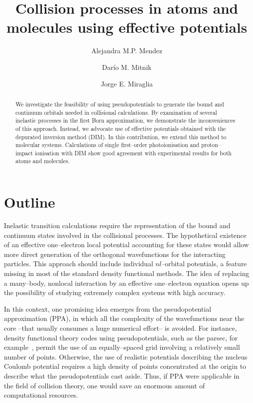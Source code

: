 \documentclass[10pt]{article}
\begin{document}
\title{Collision processes in atoms and molecules using effective 
potentials}
\author[ ]{Alejandra M.P. Mendez}
\author[ ]{Dar\'io M. Mitnik}
\author[ ]{Jorge E. Miraglia}

\maketitle

\tableofcontents

\begin{abstract}
We investigate the feasibility of using pseudopotentials to generate
the bound and continuum orbitals needed in collisional calculations. 
By examination of several inelastic processes in the first Born 
approximation, we demonstrate the inconveniences of this approach. 
Instead, we advocate use of effective potentials obtained with 
the depurated inversion method (DIM). In this contribution, we 
extend this method to molecular systems. Calculations of 
single first--order photoionisation and proton--impact ionisation with 
DIM show good agreement with experimental results for both atoms and
molecules.
\end{abstract}


\section{Outline}

Inelastic transition calculations require the representation of 
the bound and continuum states involved in the collisional processes. 
The hypothetical existence of an effective one--electron local 
potential accounting for these states would allow more direct
generation of the orthogonal wavefunctions for the interacting 
particles. This approach should include individual $nl$--orbital 
potentials, a feature missing in most of the standard density 
functional methods. The idea of replacing a many--body, nonlocal 
interaction by an effective one--electron equation opens up the 
possibility of studying extremely complex systems with high accuracy. 

In this context, one promising idea emerges from the pseudopotential
approximation (PPA), in which all the complexity of the wavefunctions 
near the core --that usually consumes a huge numerical effort-- is 
avoided. For instance, density functional theory codes using 
pseudopotentials, such as the {\sc parsec}, for 
example~\cite{parsecwebpage,Chelikowsky1994}, permit the use of an 
equally--spaced grid involving a relatively small number of points. 
Otherwise, the use of realistic potentials describing the nucleus 
Coulomb potential requires a high density of points concentrated at 
the origin to describe what the pseudopotentials cast aside. Thus, if 
PPA were applicable in the field of collision theory, one would save 
an enormous amount of computational resources.
\end{document}
